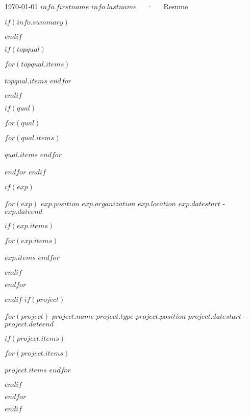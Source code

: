 \documentclass[18pt, letterpaper]{awesome-cv}
\begin{document}
\makecvheader[C]

\makecvfooter
  {\today}
  {$info.firstname$ $info.lastname$~~~·~~~Resume}
  {\thepage}


$if(info.summary)$


$endif$



$if(topqual)$
\begin{cventries}
\begin{cvitems}
$for(topqual.items)$    
    \item{$topqual.items$}
$endfor$
\end{cvitems}
\end{cventries}
$endif$

$if(qual)$
\begin{cventries}
$for(qual)$

{
\begin{cvitems}
$for(qual.items)$
    \item{$qual.items$}
$endfor$
\end{cvitems}
}

\end{cventries}
$endfor$
$endif$

$if(exp)$
\begin{cventries}

$for(exp)$
\cventry
{$exp.position$}
{$exp.organization$}
{$exp.location$}
{$exp.datestart$ - $exp.dateend$} 
{
$if(exp.items)$
\begin{cvitems}
$for(exp.items)$
    \item{$exp.items$}
$endfor$
\end{cvitems}
$endif$
}
\vspace{6mm}
$endfor$
\end{cventries}
$endif$
$if(project)$
\begin{cventries}


$for(project)$
\cventry
{$project.name$}
{$project.type$}
{$project.position$}
{$project.datestart$ - $project.dateend$}
{
$if(project.items)$
\begin{cvitems}
$for(project.items)$
    \item{$project.items$}
$endfor$
\end{cvitems}
$endif$
}
\vspace{6mm}
$endfor$
\end{cventries}
$endif$
\end{document}
